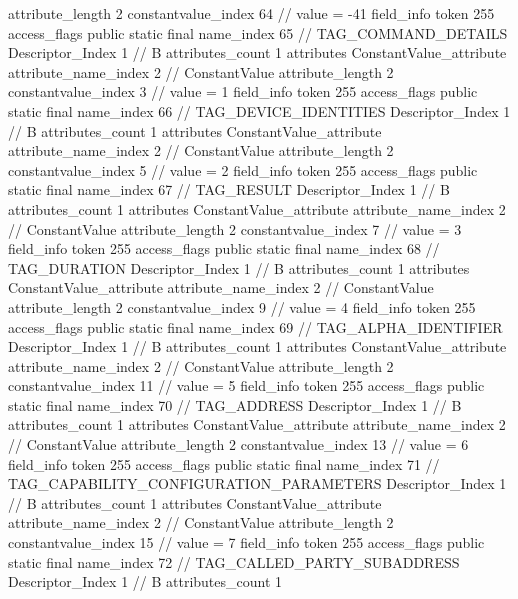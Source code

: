 {{{{{{{					attribute_length	2
					constantvalue_index	64		// value = -41
				}
				}
			}
			field_info {
				token	255
				access_flags	public static final
				name_index	65		// TAG_COMMAND_DETAILS
				Descriptor_Index	1		// B
				attributes_count	1
				attributes {
				ConstantValue_attribute {
					attribute_name_index	2		// ConstantValue
					attribute_length	2
					constantvalue_index	3		// value = 1
				}
				}
			}
			field_info {
				token	255
				access_flags	public static final
				name_index	66		// TAG_DEVICE_IDENTITIES
				Descriptor_Index	1		// B
				attributes_count	1
				attributes {
				ConstantValue_attribute {
					attribute_name_index	2		// ConstantValue
					attribute_length	2
					constantvalue_index	5		// value = 2
				}
				}
			}
			field_info {
				token	255
				access_flags	public static final
				name_index	67		// TAG_RESULT
				Descriptor_Index	1		// B
				attributes_count	1
				attributes {
				ConstantValue_attribute {
					attribute_name_index	2		// ConstantValue
					attribute_length	2
					constantvalue_index	7		// value = 3
				}
				}
			}
			field_info {
				token	255
				access_flags	public static final
				name_index	68		// TAG_DURATION
				Descriptor_Index	1		// B
				attributes_count	1
				attributes {
				ConstantValue_attribute {
					attribute_name_index	2		// ConstantValue
					attribute_length	2
					constantvalue_index	9		// value = 4
				}
				}
			}
			field_info {
				token	255
				access_flags	public static final
				name_index	69		// TAG_ALPHA_IDENTIFIER
				Descriptor_Index	1		// B
				attributes_count	1
				attributes {
				ConstantValue_attribute {
					attribute_name_index	2		// ConstantValue
					attribute_length	2
					constantvalue_index	11		// value = 5
				}
				}
			}
			field_info {
				token	255
				access_flags	public static final
				name_index	70		// TAG_ADDRESS
				Descriptor_Index	1		// B
				attributes_count	1
				attributes {
				ConstantValue_attribute {
					attribute_name_index	2		// ConstantValue
					attribute_length	2
					constantvalue_index	13		// value = 6
				}
				}
			}
			field_info {
				token	255
				access_flags	public static final
				name_index	71		// TAG_CAPABILITY_CONFIGURATION_PARAMETERS
				Descriptor_Index	1		// B
				attributes_count	1
				attributes {
				ConstantValue_attribute {
					attribute_name_index	2		// ConstantValue
					attribute_length	2
					constantvalue_index	15		// value = 7
				}
				}
			}
			field_info {
				token	255
				access_flags	public static final
				name_index	72		// TAG_CALLED_PARTY_SUBADDRESS
				Descriptor_Index	1		// B
				attributes_count	1
}}}}}
